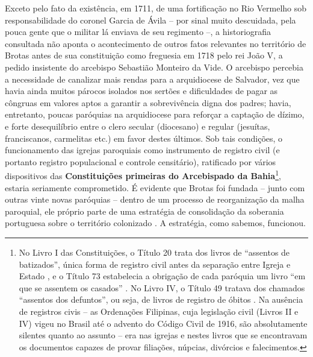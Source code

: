 Exceto pelo fato da existência, em 1711, de uma fortificação no Rio Vermelho sob responsabilidade do coronel Garcia de Ávila -- por sinal muito descuidada, pela pouca gente que o militar lá enviava de seu regimento \cite[p. 99]{cabral_manuscritos_1883} --, a historiografia consultada não aponta o acontecimento de outros fatos relevantes no território de Brotas antes de sua constituição como freguesia em 1718 pelo rei João V, a pedido insistente do arcebispo Sebastião Monteiro da Vide. O arcebispo percebia a necessidade de canalizar mais rendas para a arquidiocese de Salvador, vez que havia ainda muitos párocos isolados nos sertões e dificuldades de pagar as côngruas em valores aptos a garantir a sobrevivência digna dos padres; havia, entretanto, poucas paróquias na arquidiocese para reforçar a captação de dízimo, e forte desequilíbrio entre o clero secular (diocesano) e regular (jesuítas, franciscanos, carmelitas etc.) em favor destes últimos. Sob tais condições, o funcionamento das igrejas paroquiais como instrumento de registro civil (e portanto registro populacional e controle censitário), ratificado por vários dispositivos das \textbf{Constituições primeiras do Arcebispado da Bahia}\footnote{No Livro I das Constituições, o Título 20 trata dos livros de ``assentos de batizados'', única forma de registro civil antes da separação entre Igreja e Estado \cite[pp.~28-31]{vide_const_2007}, e o Título 73 estabelecia a obrigação de cada paróquia um livro ``em que se assentem os casados'' \cite[pp.~130-131]{vide_const_2007}. No Livro IV, o Título 49 tratava dos chamados ``assentos dos defuntos'', ou seja, de livros de registro de óbitos \cite[pp.~292-293]{vide_const_2007}. Na ausência de registros civis -- as Ordenações Filipinas, cuja legislação civil (Livros II e IV) vigeu no Brasil até o advento do Código Civil de 1916, são absolutamente silentes quanto ao assunto -- era nas igrejas e nestes livros que se encontravam os documentos capazes de provar filiações, núpcias, divórcios e falecimentos.}, estaria seriamente comprometido. É evidente que Brotas foi fundada -- junto com outras vinte novas paróquias -- dentro de um processo de reorganização da malha paroquial, ele próprio parte de uma estratégia de consolidação da soberania portuguesa sobre o território colonizado \cite[pp.~26-30]{vivas_botelho_2011}. A estratégia, como sabemos, funcionou.

